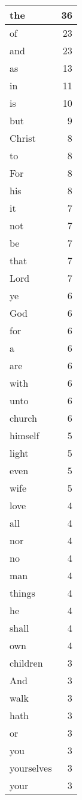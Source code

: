 \begin{center}
\begin{longtable}{l|r}
the & 36\\ \hline 
of & 23\\ \hline 
and & 23\\ \hline 
as & 13\\ \hline 
in & 11\\ \hline 
is & 10\\ \hline 
but & 9\\ \hline 
Christ & 8\\ \hline 
to & 8\\ \hline 
For & 8\\ \hline 
his & 8\\ \hline 
it & 7\\ \hline 
not & 7\\ \hline 
be & 7\\ \hline 
that & 7\\ \hline 
Lord & 7\\ \hline 
ye & 6\\ \hline 
God & 6\\ \hline 
for & 6\\ \hline 
a & 6\\ \hline 
are & 6\\ \hline 
with & 6\\ \hline 
unto & 6\\ \hline 
church & 6\\ \hline 
himself & 5\\ \hline 
light & 5\\ \hline 
even & 5\\ \hline 
wife & 5\\ \hline 
love & 4\\ \hline 
all & 4\\ \hline 
nor & 4\\ \hline 
no & 4\\ \hline 
man & 4\\ \hline 
things & 4\\ \hline 
he & 4\\ \hline 
shall & 4\\ \hline 
own & 4\\ \hline 
children & 3\\ \hline 
And & 3\\ \hline 
walk & 3\\ \hline 
hath & 3\\ \hline 
or & 3\\ \hline 
you & 3\\ \hline 
yourselves & 3\\ \hline 
your & 3\\ \hline 

\end{longtable}
\end{center}
